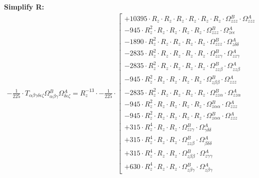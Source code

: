 \documentclass{article}
\begin{document}
\textbf{Simplify R:}
\begin{subequations}\begin{gather}
- \frac{1}{225} \cdot T_{\alpha{}\beta{}\gamma{}\delta{}\epsilon{}\zeta{}} \Omega{}^{B}_{\alpha{}\beta{}\gamma{}} \Omega{}^{A}_{\delta{}\epsilon{}\zeta{}} = R_{z}^{-13} \cdot - \frac{1}{225} \cdot  \left[ \begin{array}{c} 
 		+ 10395 \cdot R_{z} \cdot R_{z} \cdot R_{z} \cdot R_{z} \cdot R_{z} \cdot R_{z} \cdot \Omega{}^{B}_{zzz} \cdot \Omega{}^{A}_{zzz} 
 \\[0.2em] 		 - 945 \cdot R_{z}^{2} \cdot R_{z} \cdot R_{z} \cdot R_{z} \cdot R_{z} \cdot \Omega{}^{B}_{zzz} \cdot \Omega{}^{A}_{z\epsilon{}\epsilon{}} 
 \\[0.2em] 		 - 1890 \cdot R_{z}^{2} \cdot R_{z} \cdot R_{z} \cdot R_{z} \cdot R_{z} \cdot \Omega{}^{B}_{zzz} \cdot \Omega{}^{A}_{z\delta{}\delta{}} 
 \\[0.2em] 		 - 2835 \cdot R_{z}^{2} \cdot R_{z} \cdot R_{z} \cdot R_{z} \cdot R_{z} \cdot \Omega{}^{B}_{zz\gamma{}} \cdot \Omega{}^{A}_{zz\gamma{}} 
 \\[0.2em] 		 - 2835 \cdot R_{z}^{2} \cdot R_{z} \cdot R_{z} \cdot R_{z} \cdot R_{z} \cdot \Omega{}^{B}_{zz\beta{}} \cdot \Omega{}^{A}_{zz\beta{}} 
 \\[0.2em] 		 - 945 \cdot R_{z}^{2} \cdot R_{z} \cdot R_{z} \cdot R_{z} \cdot R_{z} \cdot \Omega{}^{B}_{z\beta{}\beta{}} \cdot \Omega{}^{A}_{zzz} 
 \\[0.2em] 		 - 2835 \cdot R_{z}^{2} \cdot R_{z} \cdot R_{z} \cdot R_{z} \cdot R_{z} \cdot \Omega{}^{B}_{zz\alpha{}} \cdot \Omega{}^{A}_{zz\alpha{}} 
 \\[0.2em] 		 - 945 \cdot R_{z}^{2} \cdot R_{z} \cdot R_{z} \cdot R_{z} \cdot R_{z} \cdot \Omega{}^{B}_{z\alpha{}\alpha{}} \cdot \Omega{}^{A}_{zzz} 
 \\[0.2em] 		 - 945 \cdot R_{z}^{2} \cdot R_{z} \cdot R_{z} \cdot R_{z} \cdot R_{z} \cdot \Omega{}^{B}_{z\alpha{}\alpha{}} \cdot \Omega{}^{A}_{zzz} 
 \\[0.2em] 		 + 315 \cdot R_{z}^{4} \cdot R_{z} \cdot R_{z} \cdot \Omega{}^{B}_{zz\gamma{}} \cdot \Omega{}^{A}_{\gamma{}\delta{}\delta{}} 
 \\[0.2em] 		 + 315 \cdot R_{z}^{4} \cdot R_{z} \cdot R_{z} \cdot \Omega{}^{B}_{zz\beta{}} \cdot \Omega{}^{A}_{\beta{}\delta{}\delta{}} 
 \\[0.2em] 		 + 315 \cdot R_{z}^{4} \cdot R_{z} \cdot R_{z} \cdot \Omega{}^{B}_{z\beta{}\beta{}} \cdot \Omega{}^{A}_{z\gamma{}\gamma{}} 
 \\[0.2em] 		 + 630 \cdot R_{z}^{4} \cdot R_{z} \cdot R_{z} \cdot \Omega{}^{B}_{z\beta{}\gamma{}} \cdot \Omega{}^{A}_{z\beta{}\gamma{}} 

\end{array}
\end{gather}
\end{subequations}
\end{document}
